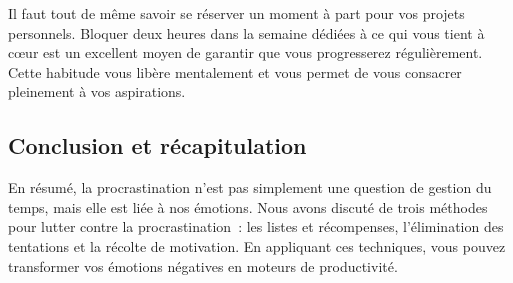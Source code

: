 \documentclass[a4paper, 12pt, garamond]{book}
\begin{document}
Il faut tout de même savoir se réserver un moment à part pour vos projets
personnels. Bloquer deux heures dans la semaine dédiées à ce qui vous tient à
cœur est un excellent moyen de garantir que vous progresserez régulièrement.
Cette habitude vous libère mentalement et vous permet de vous consacrer
pleinement à vos aspirations.

%
%

\subsection{Conclusion et récapitulation}

En résumé, la procrastination n'est pas simplement une question de gestion du
temps, mais elle est liée à nos émotions. Nous avons discuté de trois méthodes
pour lutter contre la procrastination~: les listes et récompenses, l'élimination
des tentations et la récolte de motivation. En appliquant ces techniques, vous
pouvez transformer vos émotions négatives en moteurs de productivité.
\end{document}

